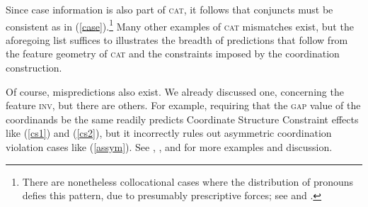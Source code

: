 \documentclass[output=paper
                ,modfonts
                ,nonflat
	        ,collection
	        ,collectionchapter
	        ,collectiontoclongg
 	        ,biblatex
                ,babelshorthands
                ,newtxmath
                ,draftmode
                ,colorlinks, citecolor=brown
]{./langsci/langscibook}
\begin{document}
\noindent
Since case information is also part of \textsc{cat}, it follows that conjuncts must be consistent as in (\ref{case}).\footnote{There are nonetheless collocational cases where the distribution of pronouns defies this pattern, due to presumably prescriptive forces; see \citet{grano} and \citet{Lohmann2014a-u}.} Many other examples of \textsc{cat} mismatches exist, but the aforegoing list suffices to
illustrates the breadth of predictions that follow from the feature geometry of \textsc{cat} and the constraints imposed by
the coordination construction.

\begin{exe}
\ex
\begin{xlista}
\end{xlista}\label{case}
\end{exe}




Of course, mispredictions also exist. We already discussed one, concerning the feature \textsc{inv}, but there are others. For example, requiring that the \textsc{gap} value of the coordinands be the same readily predicts Coordinate Structure Constraint effects like 
(\ref{cs1}) and (\ref{cs2}), but it incorrectly rules out asymmetric coordination violation cases like (\ref{assym}). 
See \citet{goldsmith}, \citet{lakoff86}, and  \citet{levinprince86} for more examples and discussion.



\begin{exe}
\ex \begin{xlista}


\end{xlista}\label{cs1}
\end{exe}
\end{document}
